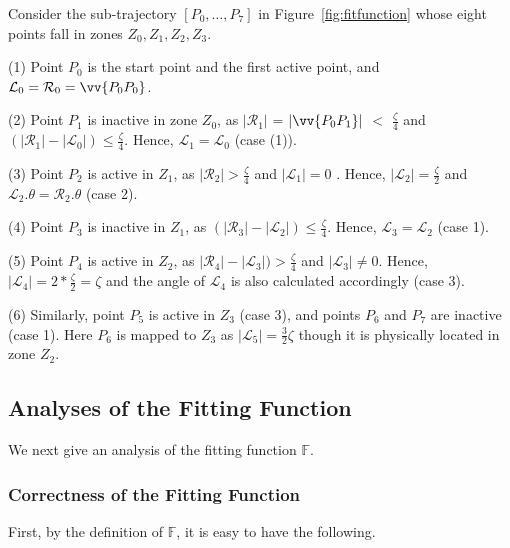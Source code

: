 \begin{example}
\label{exm-fittingfunction}
Consider the sub-trajectory $[P_0,\ldots, P_7]$  in Figure~\ref{fig:fitfunction} whose eight points fall in zones $Z_0, Z_1, Z_2, Z_3$.

\sstab (1) Point $P_0$ is the start point and the first active point, and $\mathcal{L}_0 = \mathcal{R}_0 = \vv{P_0P_0}$.

\sstab (2) Point $P_1$ is inactive in zone $Z_0$, as $|\mathcal{R}_{1}|$ = $|\vv{P_0P_1}|$ $<$ $\frac{\zeta}{4}$ and $(|\mathcal{R}_{1}| - |\mathcal{L}_{0}|) \le \frac{\zeta}{4}$. Hence, $\mathcal{L}_{1} = \mathcal{L}_{0}$  (case (1)).

\sstab (3) Point $P_2$ is active in $Z_1$, as $|\mathcal{R}_{2}| >  \frac{\zeta}{4}$ and $|\mathcal{L}_{1}|=0$ .
Hence, $|\mathcal{L}_{2}|  = \frac{\zeta}{2}$ and $\mathcal{L}_{2}.\theta = \mathcal{R}_{2}.\theta$ (case 2).

\sstab (4) Point $P_3$ is inactive in $Z_1$, as $(|\mathcal{R}_{3}| - |\mathcal{L}_{2}|) \le \frac{\zeta}{4}$. Hence, $\mathcal{L}_{3} = \mathcal{L}_{2}$  (case 1).

\sstab (5) Point $P_4$ is active in $Z_2$, as $|\mathcal{R}_{4}| - |\mathcal{L}_{3}|) > \frac{\zeta}{4}$ and $|\mathcal{L}_{3}|\ne 0$. Hence, $|\mathcal{L}_{4}|  = 2*\frac{\zeta}{2} = \zeta$ and the angle of $\mathcal{L}_4$ is also calculated accordingly (case 3).

\sstab (6) Similarly, point $P_5$ is active in $Z_3$ (case 3), and points $P_6$ and $P_7$ are inactive  (case 1). Here $P_6$ is mapped to $Z_3$ as $|\mathcal{L}_{5}| = \frac{3}{2}\zeta$ though it is physically located in zone $Z_2$.
\end{example}




\subsection {Analyses of the Fitting Function}
\label{susubbsec-fittingfunction-analysis}

We next give an analysis of the fitting function $\mathbb{F}$.

\subsubsection{Correctness of the Fitting Function}

First, by the definition of $\mathbb{F}$, it is easy to have the following.


